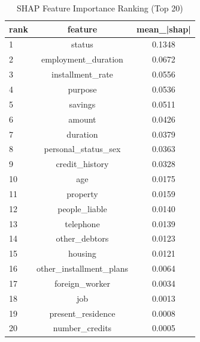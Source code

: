 \begin{table}
\centering
\caption{SHAP Feature Importance Ranking (Top 20)}
\label{tab:shap_ranking}
\begin{tabular}{lcc}
\toprule
rank & feature & mean_|shap| \\
\midrule
1 & status & 0.1348 \\
2 & employment_duration & 0.0672 \\
3 & installment_rate & 0.0556 \\
4 & purpose & 0.0536 \\
5 & savings & 0.0511 \\
6 & amount & 0.0426 \\
7 & duration & 0.0379 \\
8 & personal_status_sex & 0.0363 \\
9 & credit_history & 0.0328 \\
10 & age & 0.0175 \\
11 & property & 0.0159 \\
12 & people_liable & 0.0140 \\
13 & telephone & 0.0139 \\
14 & other_debtors & 0.0123 \\
15 & housing & 0.0121 \\
16 & other_installment_plans & 0.0064 \\
17 & foreign_worker & 0.0034 \\
18 & job & 0.0013 \\
19 & present_residence & 0.0008 \\
20 & number_credits & 0.0005 \\
\bottomrule
\end{tabular}
\end{table}
